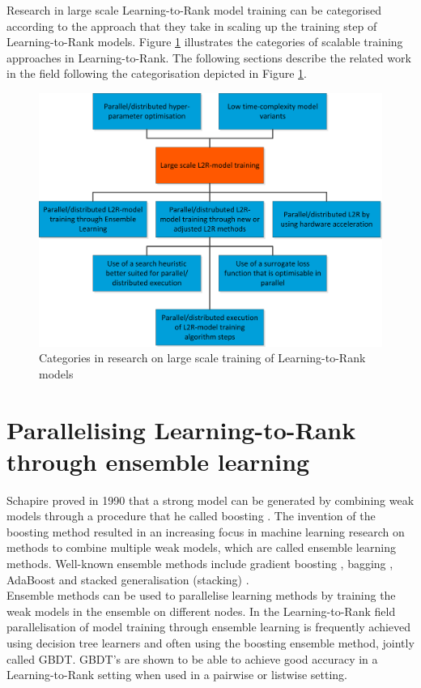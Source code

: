 Research in large scale Learning-to-Rank model training can be categorised according to the approach that they take in scaling up the training step of Learning-to-Rank models. Figure \ref{fig:related_work_categories} illustrates the categories of scalable training approaches in Learning-to-Rank. The following sections describe the related work in the field following the categorisation depicted in Figure \ref{fig:related_work_categories}.

\begin{figure}
\includegraphics{gfx/related_work_categories}
\caption{Categories in research on large scale training of  Learning-to-Rank models}
\label{fig:related_work_categories}
\end{figure}

\section{Parallelising Learning-to-Rank through ensemble learning}
Schapire proved in 1990 that a strong model can be generated by combining weak models through a procedure that he called boosting \cite{Schapire1990}. The invention of the boosting method resulted in an increasing focus in machine learning research on methods to combine multiple weak models, which are called ensemble learning methods. Well-known ensemble methods include gradient boosting \cite{Friedman2001}, bagging \cite{Breiman1996}, AdaBoost \cite{Freund1997} and stacked generalisation (stacking) \cite{Wolpert1992}.\\

Ensemble methods can be used to parallelise learning methods by training the weak models in the ensemble on different nodes. In the Learning-to-Rank field parallelisation of model training through ensemble learning is frequently achieved using decision tree learners and often using the boosting ensemble method, jointly called \acf{GBDT}. \ac{GBDT}'s are shown to be able to achieve good accuracy in a Learning-to-Rank setting when used in a pairwise \cite{Zheng2007} or listwise \cite{Chen2008} setting.

